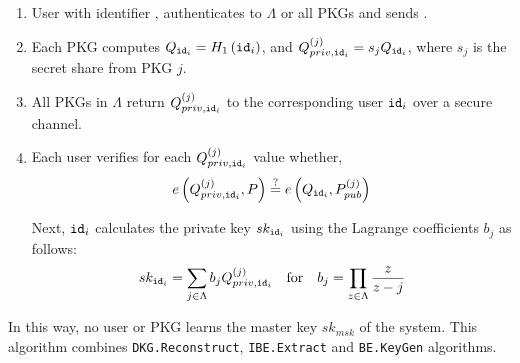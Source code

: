 \begin{algorithm}[H]
\begin{description}
    \begin{enumerate}
        \item User with identifier , authenticates to $\Lambda$ or all PKGs and sends .
        \item Each PKG computes $Q_{\mathtt{id}_{i}} = H_1 \left( \mathtt{id}_{i} \right)$, and $Q_{priv,\mathtt{id}_{i}}^{(j)} = s_j Q_{\mathtt{id}_{i}}$, where $s_j$ is the secret share from PKG $j$.
        \item All PKGs in $\Lambda$ return $Q_{priv,\mathtt{id}_{i}}^{(j)}$ to the corresponding user $\mathtt{id}_{i}$ over a secure channel.
        \item Each user verifies for each $Q_{priv,\mathtt{id}_{i}}^{(j)}$ value whether, 
        \begin{equation*}
            e \left( Q_{priv , \mathtt{id}_{i} }^{(j)}, P \right ) \stackrel{?}{=} e \left( Q_{\mathtt{id}_{i}}, P_{pub}^{(j)} \right)
        \end{equation*}
        
        Next, $\mathtt{id}_{i}$ calculates the private key $sk_{\mathtt{id}_{i}}$ using the Lagrange coefficients $b_j$ as follows: 
        \begin{equation*}
            sk_{\mathtt{id}_{i}} = \sum\limits_{j\in\Lambda} b_j Q_{priv,\mathtt{id}_{i}}^{(j)} \quad \textrm{for} \quad b_j = \prod_{z\in \Lambda} \frac{z}{z-j}
        \end{equation*}
        \end{enumerate}
        In this way, no user or PKG learns the master key $sk_{msk}$ of the system. This algorithm combines \texttt{DKG.Reconstruct}, \texttt{IBE.Extract} and \texttt{BE.KeyGen} algorithms.

    \bigskip
    \bigskip
    \bigskip
    \bigskip
    \bigskip
    \bigskip
    \bigskip 
    \bigskip
    \bigskip
    \bigskip
    \bigskip
    \bigskip
    \bigskip
    \bigskip
    \bigskip 
    \bigskip
    \bigskip
    \bigskip
    \bigskip 
\end{description}
\end{algorithm}


